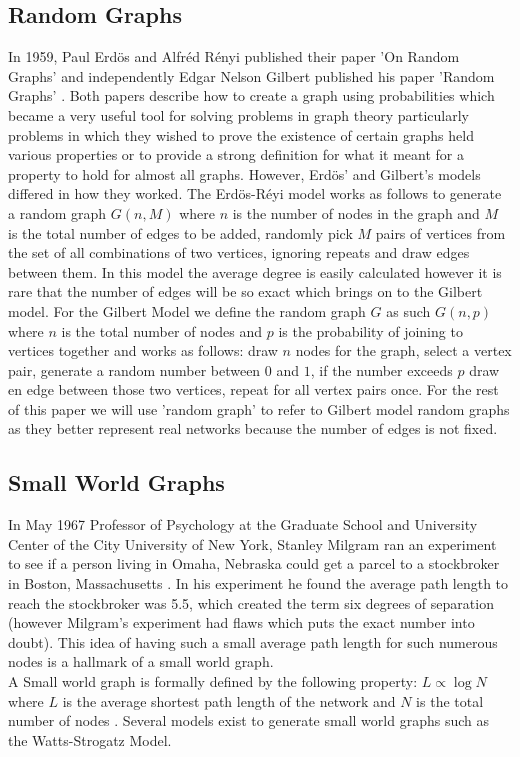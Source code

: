 \documentclass{article}
\begin{document}
        \subsection{Random Graphs}
        In 1959, Paul Erd\"{o}s and Alfr\'{e}d R\'{e}nyi published their paper 'On Random Graphs' \parencite{erd6s1959random} and independently Edgar Nelson Gilbert published his paper 'Random Graphs' \parencite{gilbert1959random}. Both papers describe how to create a graph using probabilities which became a very useful tool for solving problems in graph theory particularly problems in which they wished to prove the existence of certain graphs held various properties or to provide a strong definition for what it meant for a property to hold for almost all graphs. However, Erd\"{o}s' and Gilbert's models differed in how they worked. The Erd\"{o}s-R\'{e}yi model works as follows to generate a random graph $G(n,M)$ where $n$ is the number of nodes in the graph and $M$ is the total number of edges to be added, randomly pick $M$ pairs of vertices from the set of all combinations of two vertices, ignoring repeats and draw edges between them. In this model the average degree is easily calculated however it is rare that the number of edges will be so exact which brings on to the Gilbert model. For the Gilbert Model we define the random graph $G$ as such $G(n,p)$ where $n$ is the total number of nodes and $p$ is the probability of joining to vertices together and works as follows: draw $n$ nodes for the graph, select a vertex pair, generate a random number between $0$ and $1$, if the number exceeds $p$ draw en edge between those two vertices, repeat for all vertex pairs once. For the rest of this paper we will use 'random graph' to refer to Gilbert model random graphs as they better represent real networks because the number of edges is not fixed. 
        \subsection{Small World Graphs}
        In May 1967 Professor of Psychology at the Graduate School and University Center of the City University of New York, Stanley Milgram ran an experiment to see if a person living
        in Omaha, Nebraska could get a parcel to a stockbroker in Boston, Massachusetts \parencite{milgram1967small}. In his experiment he found the average path length to reach the stockbroker was 5.5, which created the term
        six degrees of separation (however Milgram's experiment had flaws which puts the exact number into doubt). This idea of having such a small average path length for such numerous nodes is a hallmark of a small world graph.\\
        A Small world graph is formally defined by the following property: $L\propto\log{N}$ where $L$ is the average shortest path length of the network and $N$ is the total number of nodes \parencite{Watts1998}. Several models exist to generate small world graphs such as the Watts-Strogatz Model.
\end{document}
